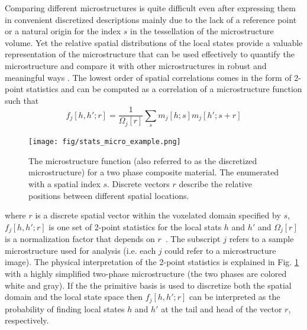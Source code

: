 \documentclass{bmcart}
\begin{document}
Comparing different microstructures is quite difficult even after
expressing them in convenient discretized descriptions mainly due to
the lack of a reference point or a natural origin for the index $s$ in
the tessellation of the microstructure volume. Yet the relative
spatial distributions of the local states provide a valuable
representation of the microstructure that can be used effectively to
quantify the microstructure and compare it with other microstructures
in robust and meaningful ways \cite{niezgoda2011understanding,
niezgoda2010optimized, niezgoda2013novel, cceccen2014data,
cecen2016versatile}. The lowest order of spatial correlations comes
in the form of 2-point statistics and can be computed as a correlation
of a microstructure function such that
\begin{equation}\label{eq:stats}
    f_j[h, h'; r] = \frac{1}{\Omega_j\left[r\right]}
    \sum_{s} m_j[h; s] m_j[h'; s +  r]
\end{equation}
\begin{figure}
    \centering
    \texttt{[image: fig/stats\_micro\_example.png]}
    \caption{The microstructure function (also referred to as the discretized microstructure) for a two phase composite material.
    The enumerated with a spatial index $s$. Discrete vectors $r$ describe the relative positions between different spatial locations.}
    \label{fig:stats}
\end{figure}
where $r$ is a discrete spatial vector within the voxelated domain
specified by $s$, $f_j[h, h'; r]$ is one set of 2-point statistics for
the local stats $h$ and $h'$ and $\Omega_j\left[r\right]$ is a
normalization factor that depends on
$r$~\cite{cecen2016versatile}. The subscript $j$ refers to a sample
microstructure used for analysis (i.e. each $j$ could refer to a
microstructure image). The physical interpretation of the 2-point
statistics is explained in Fig. \ref{fig:stats} with a highly
simplified two-phase microstructure (the two phases are colored white
and gray). If the the primitive basis is used to discretize both the
spatial domain and the local state space then $f_j[h, h'; r]$ can be
interpreted as the probability of finding local states $h$ and $h'$ at
the tail and head of the vector $r$, respectively.
\end{document}
